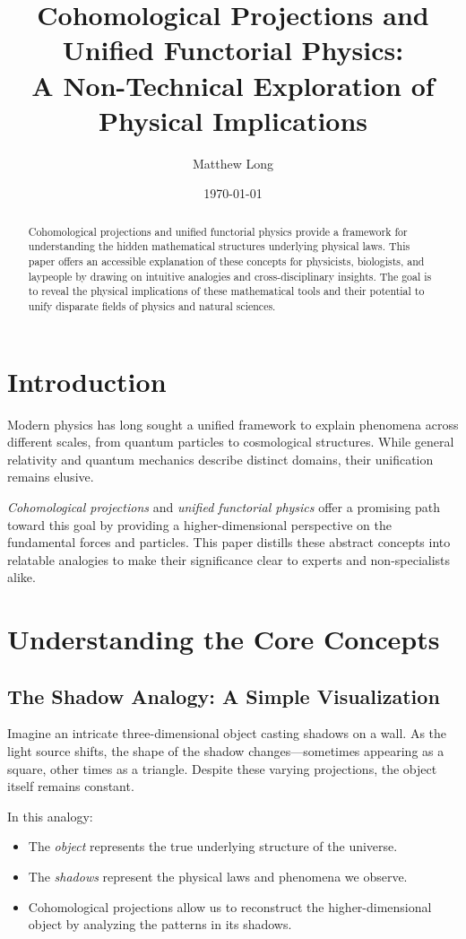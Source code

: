\documentclass{article}
\title{\textbf{Cohomological Projections and Unified Functorial Physics:}\\
\large{A Non-Technical Exploration of Physical Implications}}
\author{Matthew Long}
\date{\today}
\begin{document}
\maketitle
\begin{abstract}
Cohomological projections and unified functorial physics provide a framework for understanding the hidden mathematical structures underlying physical laws. This paper offers an accessible explanation of these concepts for physicists, biologists, and laypeople by drawing on intuitive analogies and cross-disciplinary insights. The goal is to reveal the physical implications of these mathematical tools and their potential to unify disparate fields of physics and natural sciences.
\end{abstract}

\section{Introduction}
Modern physics has long sought a unified framework to explain phenomena across different scales, from quantum particles to cosmological structures. While general relativity and quantum mechanics describe distinct domains, their unification remains elusive. 

\textit{Cohomological projections} and \textit{unified functorial physics} offer a promising path toward this goal by providing a higher-dimensional perspective on the fundamental forces and particles. This paper distills these abstract concepts into relatable analogies to make their significance clear to experts and non-specialists alike.

\section{Understanding the Core Concepts}
\subsection{The Shadow Analogy: A Simple Visualization}
Imagine an intricate three-dimensional object casting shadows on a wall. As the light source shifts, the shape of the shadow changes—sometimes appearing as a square, other times as a triangle. Despite these varying projections, the object itself remains constant.

In this analogy: 
\begin{itemize}
    \item The \textit{object} represents the true underlying structure of the universe.
    \item The \textit{shadows} represent the physical laws and phenomena we observe.
    \item Cohomological projections allow us to reconstruct the higher-dimensional object by analyzing the patterns in its shadows.
\end{itemize}
\end{document}
